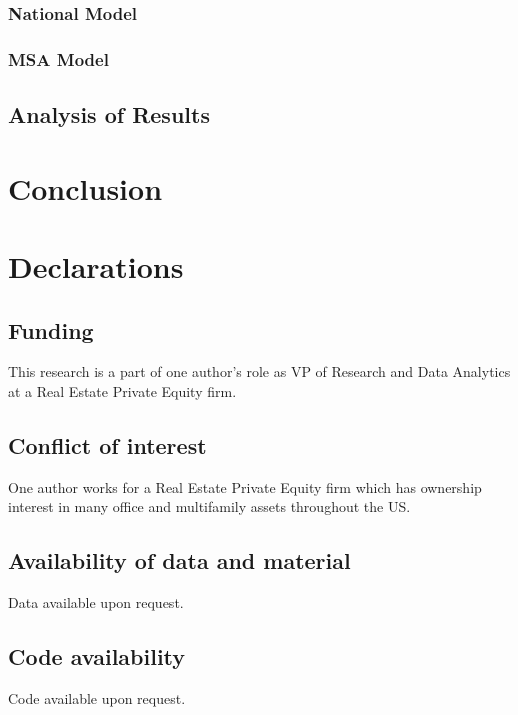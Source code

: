 \subsubsection{National Model}

\subsubsection{MSA Model}



\subsection{Analysis of Results}


\section{Conclusion}

\pagebreak


%
\section*{Declarations}
\subsection{Funding}
This research is a part of one author's role as VP of Research and Data Analytics at a Real Estate Private Equity firm. 

\subsection{Conflict of interest}
One author works for a Real Estate Private Equity firm which has ownership interest in many office and multifamily assets throughout the US. 

\subsection{Availability of data and material}
Data available upon request.

\subsection{Code availability}
Code available upon request.

